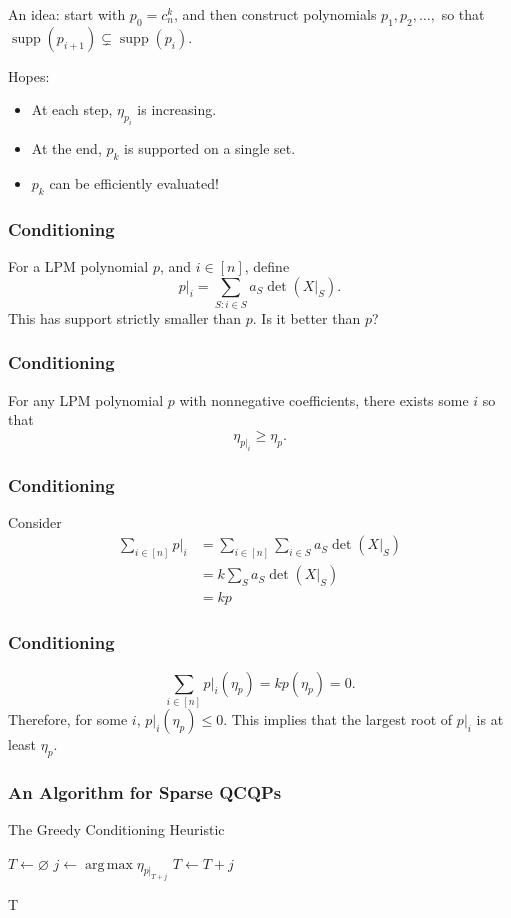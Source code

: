\documentclass{beamer}
\DeclareMathOperator*{\argmax}{arg\,max}
\DeclareMathOperator*{\supp}{supp}
\begin{document}
\begin{frame}
    An idea: start with $p_0 = c_n^k$, and then construct polynomials $p_1,p_2 ,\dots, $ so that $\supp(p_{i+1}) \subsetneq \supp(p_{i})$.

    Hopes:
    \begin{itemize}
        \item At each step, $\eta_{p_i}$ is increasing.
        \item At the end, $p_k$ is supported on a single set.
        \pause
        \item $p_k$ can be efficiently evaluated!
    \end{itemize}
\end{frame}
\begin{frame}
    \frametitle{Conditioning}
    For a LPM polynomial $p$, and $i \in [n]$, define
    \[
        p|_i = \sum_{S : i \in S} a_S \det(X|_S).
    \]
    This has support strictly smaller than $p$. Is it better than $p$?
\end{frame}
\begin{frame}
    \frametitle{Conditioning}
    \begin{theorem}
    For any LPM polynomial $p$ with nonnegative coefficients, there exists some $i$ so that
    \[
        \eta_{p|_i} \ge \eta_{p}.
    \]
    \end{theorem}
\end{frame}
\begin{frame}
    \frametitle{Conditioning}
    Consider
        \begin{align*} 
        \sum_{i \in [n]} p|_{i}&=\sum_{i \in [n]} \sum_{i \in  S} a_S \det(X|_S)\\
                &=k\sum_{S} a_S \det(X|_S)\\
                &=kp
        \end{align*}
\end{frame}
\begin{frame}
    \frametitle{Conditioning}
    \[
        \sum_{i\in [n]}p|_i(\eta_p) = kp(\eta_p) = 0.
    \]
    \pause
    Therefore, for some $i$, $ p|_{i}(\eta_{p}) \le 0$.
    \pause
    This implies that the largest root of $p|_{i}$ is at least $\eta_{p}$.
\end{frame}
\begin{frame}
    \begin{algorithm}[H]
    \frametitle{An Algorithm for Sparse QCQPs}
    \caption{The Greedy Conditioning Heuristic}
    \label{alg:greedy}
    \begin{algorithmic}
        \State $T \gets \varnothing$
            \State $j \gets \argmax \eta_{p|_{T + j}}$
            \State $T \gets T + j$
        \EndFor

        \Return T
    \end{algorithmic}
    \end{algorithm}
\end{frame}
\end{document}
